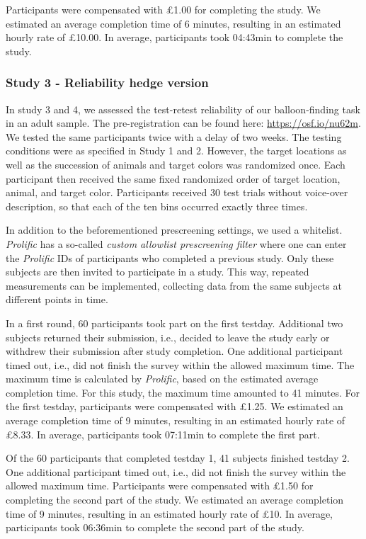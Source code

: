 \documentclass[
  english,
  man,floatsintext]{apa6}
\begin{document}
Participants were compensated with £1.00 for completing the study. We estimated an average completion time of 6 minutes, resulting in an estimated hourly rate of £10.00. In average, participants took 04:43min to complete the study.

\hypertarget{study-3---reliability-hedge-version}{%
\subsubsection{Study 3 - Reliability hedge version}\label{study-3---reliability-hedge-version}}

In study 3 and 4, we assessed the test-retest reliability of our balloon-finding task in an adult sample. The pre-registration can be found here: \url{https://osf.io/nu62m}. We tested the same participants twice with a delay of two weeks. The testing conditions were as specified in Study 1 and 2. However, the target locations as well as the succession of animals and target colors was randomized once. Each participant then received the same fixed randomized order of target location, animal, and target color. Participants received 30 test trials without voice-over description, so that each of the ten bins occurred exactly three times.

In addition to the beforementioned prescreening settings, we used a whitelist. \emph{Prolific} has a so-called \emph{custom allowlist prescreening filter} where one can enter the \emph{Prolific} IDs of participants who completed a previous study. Only these subjects are then invited to participate in a study. This way, repeated measurements can be implemented, collecting data from the same subjects at different points in time.

In a first round, 60 participants took part on the first testday. Additional two subjects returned their submission, i.e., decided to leave the study early or withdrew their submission after study completion. One additional participant timed out, i.e., did not finish the survey within the allowed maximum time. The maximum time is calculated by \emph{Prolific}, based on the estimated average completion time. For this study, the maximum time amounted to 41 minutes. For the first testday, participants were compensated with £1.25. We estimated an average completion time of 9 minutes, resulting in an estimated hourly rate of £8.33. In average, participants took 07:11min to complete the first part.

Of the 60 participants that completed testday 1, 41 subjects finished testday 2. One additional participant timed out, i.e., did not finish the survey within the allowed maximum time. Participants were compensated with £1.50 for completing the second part of the study. We estimated an average completion time of 9 minutes, resulting in an estimated hourly rate of £10. In average, participants took 06:36min to complete the second part of the study.
\end{document}
